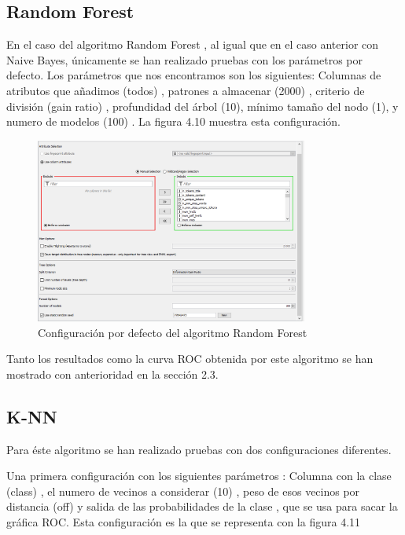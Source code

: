 	\subsection{Random Forest}
	
	En el caso del algoritmo Random Forest , al igual que en el caso anterior con Naive Bayes, únicamente se han realizado pruebas con los parámetros por defecto. Los parámetros que nos encontramos son los siguientes: Columnas de atributos que añadimos (todos) , patrones a almacenar (2000) , criterio de división (gain ratio) , profundidad del árbol (10), mínimo tamaño del nodo (1), y numero de modelos (100) . La figura 4.10 muestra esta configuración.
	
	\begin{figure}[htb]
		\centering
		\includegraphics[width=0.8\textwidth]{./imagenes/49}
		\caption{Configuración por defecto del algoritmo Random Forest} \label{fig:1}
	\end{figure}
	
	Tanto los resultados como la curva ROC obtenida por este algoritmo se han mostrado con anterioridad en la sección 2.3.
	
	
	\subsection{K-NN}
	
	Para éste algoritmo se han realizado pruebas con dos configuraciones diferentes.
	
	Una primera configuración con los siguientes parámetros : Columna con la clase (class) , el numero de vecinos a considerar (10) , peso de esos vecinos por distancia (off) y salida de las probabilidades de la clase , que se usa para sacar la gráfica ROC. Esta configuración es la que se representa con la figura 4.11
	
